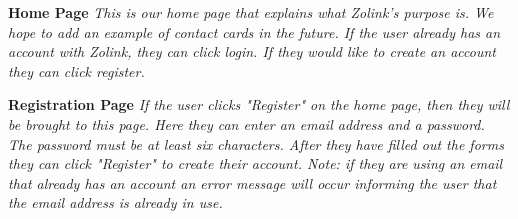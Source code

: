 \documentclass[12pt]{article}%
\begin{document}
\begin{center}

	{\bf \Large Home Page}
	{\it This is our home page that explains what Zolink's purpose is.
		We hope to add an example of contact cards in the future. If the user already has an account with Zolink, they 
	can click login. If they would like to create an account they can click register. }
	
	
	\clearpage
	{\bf \Large Registration Page}
	{\it If the user clicks "Register" on the home page, then they will be brought to this page. Here they can enter an 
	email address and a password. The password must be at least six characters. After they have filled out the forms they can 
	click "Register" to create their account. Note: if they are using an email that already has an account an error message will occur 
	informing the user that the email address is already in use.}


\end{center}
\end{document}
